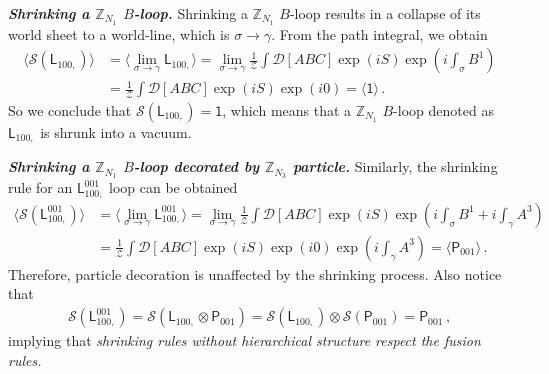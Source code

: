\documentclass[11pt,nofootinbib,preprint]{revtex4-1}
\begin{document}
\textbf{\textit{Shrinking a $\mathbb{Z}_{N_1}$ $B$-loop.}}
Shrinking a $\mathbb{Z}_{N_1}$ $B$-loop results in a collapse of  its world sheet to a world-line, which is $\sigma\rightarrow \gamma$. From the path integral, we obtain
\begin{align}
	\langle \mathcal{S} \left( \mathsf{L}_{100,} \right) \rangle &=\langle \underset{\sigma \rightarrow \gamma}{\lim}\mathsf{L}_{100,} \rangle =\underset{\sigma \rightarrow \gamma}{\lim}\frac{1}{\mathcal{Z}}\int{\mathcal{D} \left[ ABC \right] \exp \left( iS \right) \exp \left( i\int_{\sigma}{B^1} \right)}\nonumber
	\\
	&=\frac{1}{\mathcal{Z}}\int{\mathcal{D} \left[ ABC \right] \exp \left( iS \right) \exp \left( i0 \right)}=\langle \mathsf{1} \rangle\,. 
\end{align}
So we conclude that
 $	\mathcal{S} \left( \mathsf{L}_{100,} \right)=\mathsf{1}
$, which means that a $\mathbb{Z}_{N_1}$ $B$-loop denoted as $\mathsf{L}_{100,}$ is shrunk into a vacuum.




\textbf{\textit{Shrinking a $\mathbb{Z}_{N_1}$ $B$-loop decorated by $\mathbb{Z}_{N_3}$ particle.}}
Similarly, the shrinking rule for an $\mathsf{L}_{100,}^{001}$ loop can be obtained
\begin{align}
	\langle \mathcal{S} \left( \mathsf{L}_{100,}^{001} \right) \rangle &=\langle \underset{\sigma \rightarrow \gamma}{\lim}\mathsf{L}_{100,}^{001} \rangle =\underset{\sigma \rightarrow \gamma}{\lim}\frac{1}{\mathcal{Z}}\int{\mathcal{D} \left[ ABC\right] \exp \left( iS \right) \exp \left( i\int_{\sigma}{B^1}+i\int_{\gamma}{A^3} \right)}\nonumber
	\\
	&=\frac{1}{\mathcal{Z}}\int{\mathcal{D} \left[ ABC \right] \exp \left( iS \right) \exp \left( i0 \right) \exp \left( i\int_{\gamma}{A^3} \right)}=\langle \mathsf{P}_{001} \rangle \,.
\end{align}
Therefore, particle decoration is unaffected by the shrinking process. Also notice that 
\begin{align}
	\mathcal{S} \left( \mathsf{L}_{100,}^{001} \right)=\mathcal{S} \left( \mathsf{L}_{100,}\otimes \mathsf{P}_{001} \right)=\mathcal{S} \left( \mathsf{L}_{100,} \right)\otimes\mathcal{S} \left( \mathsf{P}_{001} \right)=\mathsf{P}_{001}\,,
\end{align}
implying that \textit{shrinking rules without hierarchical structure respect the fusion rules.} 
\end{document}
